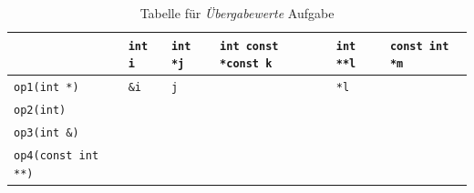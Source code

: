 \begin{table}[h]
    \centering

    \newcolumntype{b}{X}

    \begin{tabularx}{\textwidth}{b *5{| >{\centering\arraybackslash}s}@{}} 
		& \mbox{\lstinline!int i!} & \mbox{\lstinline!int *j!} & \mbox{\lstinline!int const *const k!} & \mbox{\lstinline!int **l!} & \mbox{\lstinline!const int *m!} \\ \hline
		\mbox{\lstinline!op1(int *)!}          & \mbox{\lstinline!&i!} & \mbox{\lstinline!j!} & \xmark & \mbox{\lstinline!*l!} & \xmark \\ \hline
		\mbox{\lstinline!op2(int)!}            & & & & & \\ \hline
		\mbox{\lstinline!op3(int &)!}         & & & & & \\ \hline
		\mbox{\lstinline!op4(const int **)!}   & & & & & 
    \end{tabularx}
    \caption{Tabelle für \emph{Übergabewerte} Aufgabe}
    \label{table:uebergabewerte}
\end{table}
